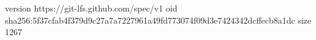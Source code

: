 version https://git-lfs.github.com/spec/v1
oid sha256:5f37cfab4f379d9c27a7a7227961a49fd773074f09d3e7424342dcffecb8a1dc
size 1267
